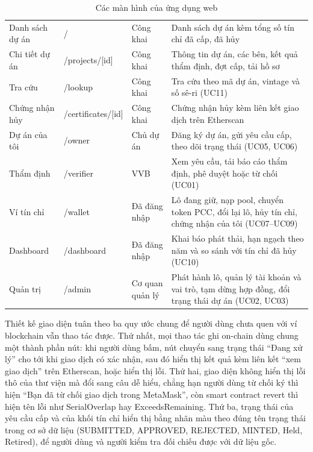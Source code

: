 \begin{table}[!htbp]
    \centering
    \caption{Các màn hình của ứng dụng web}
    \label{tab:manhinh}
    \small
    \begin{tabularx}{\textwidth}{|L{2.6cm}|L{2.8cm}|L{2.6cm}|Y|}
        \hline
         &  &  &  \\
        \hline
        Danh sách dự án & / & Công khai & Danh sách dự án kèm tổng số tín chỉ đã cấp, đã hủy \\
        \hline
        Chi tiết dự án & /projects/[id] & Công khai & Thông tin dự án, các bên, kết quả thẩm định, đợt cấp, tải hồ sơ \\
        \hline
        Tra cứu & /lookup & Công khai & Tra cứu theo mã dự án, vintage và số sê-ri (UC11) \\
        \hline
        Chứng nhận hủy & /certificates/[id] & Công khai & Chứng nhận hủy kèm liên kết giao dịch trên Etherscan \\
        \hline
        Dự án của tôi & /owner & Chủ dự án & Đăng ký dự án, gửi yêu cầu cấp, theo dõi trạng thái (UC05, UC06) \\
        \hline
        Thẩm định & /verifier & VVB & Xem yêu cầu, tải báo cáo thẩm định, phê duyệt hoặc từ chối (UC01) \\
        \hline
        Ví tín chỉ & /wallet & Đã đăng nhập & Lô đang giữ, nạp pool, chuyển token PCC, đổi lại lô, hủy tín chỉ, chứng nhận của tôi (UC07--UC09) \\
        \hline
        Dashboard & /dashboard & Đã đăng nhập & Khai báo phát thải, hạn ngạch theo năm và so sánh với tín chỉ đã hủy (UC10) \\
        \hline
        Quản trị & /admin & Cơ quan quản lý & Phát hành lô, quản lý tài khoản và vai trò, tạm dừng hợp đồng, đổi trạng thái dự án (UC02, UC03) \\
        \hline
    \end{tabularx}
\end{table}

Thiết kế giao diện tuân theo ba quy ước chung để người dùng chưa quen với ví blockchain vẫn thao tác được. Thứ nhất, mọi thao tác ghi on-chain dùng chung một thành phần nút: khi người dùng bấm, nút chuyển sang trạng thái ``Đang xử lý'' cho tới khi giao dịch có xác nhận, sau đó hiển thị kết quả kèm liên kết ``xem giao dịch'' trên Etherscan, hoặc hiển thị lỗi. Thứ hai, giao diện không hiển thị lỗi thô của thư viện mà đổi sang câu dễ hiểu, chẳng hạn người dùng từ chối ký thì hiện ``Bạn đã từ chối giao dịch trong MetaMask'', còn smart contract revert thì hiện tên lỗi như SerialOverlap hay ExceedsRemaining. Thứ ba, trạng thái của yêu cầu cấp và của khối tín chỉ hiển thị bằng nhãn màu theo đúng tên trạng thái trong cơ sở dữ liệu (SUBMITTED, APPROVED, REJECTED, MINTED, Held, Retired), để người dùng và người kiểm tra đối chiếu được với dữ liệu gốc.

